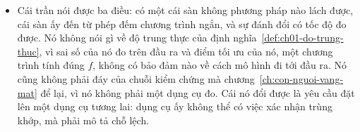 \begin{tomtat}
\begin{itemize}
  trội của vế toàn cục. Bài phát biểu quy ước ấy trong chính định lý và không
  mang nó vào phép so.
  \item Cái trần nói được ba điều: có một cái sàn không phương pháp nào lách
  được, cái sàn ấy đến từ phép đếm chương trình ngắn, và sự đánh đổi có tốc độ
  đo được. Nó không nói gì về độ trung thực của định
  nghĩa~\ref{def:ch01-do-trung-thuc}, vì sai số của nó đo trên đầu ra và điểm
  tối ưu của nó, một chương trình tính đúng $f$, không có bảo đảm nào về cách mô
  hình đi tới đầu ra. Nó cũng không phải đáy của chuỗi kiểm chứng mà
  chương~\ref{ch:con-nguoi-vang-mat} để lại, vì nó không phải một dụng cụ đo.
  Cái nó đổi được là yêu cầu đặt lên một dụng cụ tương lai: dụng cụ ấy không thể
  có việc xác nhận trùng khớp, mà phải mô tả chỗ lệch.
\end{itemize}
\end{tomtat}

